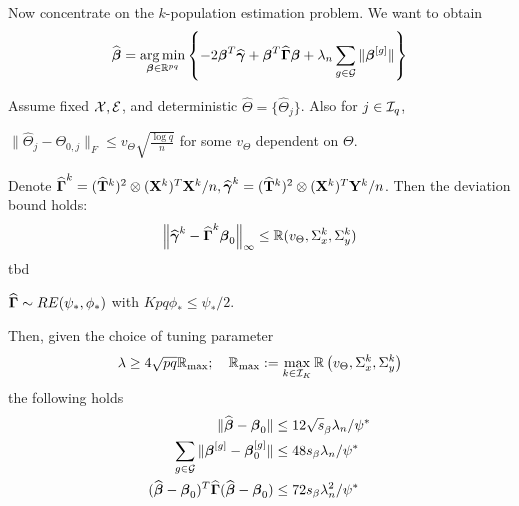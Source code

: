 \documentclass[12pt, letterpaper]{article}
\DeclareMathOperator*{\ve}{vec}
\DeclareMathOperator*{\argmin}{arg\,min}
\numberwithin{equation}{section}
\begin{document}
\hrulefill

Now concentrate on the $k$-population estimation problem. We want to obtain
%
$$
\widehat \bfbeta = \argmin_{\bfbeta \in \BR^{pq}} \left\{-2 \bfbeta^T \widehat \bfgamma + \bfbeta^T \widehat \bfGamma \bfbeta + \lambda_n \sum_{g \in \cG} \| \bfbeta^{[g]}  \| \right\}
$$
\begin{Theorem}\label{thm:BetaThm}
Assume fixed ${\cal{X}}, {\cal{E}}$, and deterministic $\widehat \Theta = \{ \widehat \Theta_j \}$. Also for $j \in {\cal{I}}_q$,

 $\| \widehat \Theta_j - \Theta_{0,j} \|_F \leq v_\Theta \sqrt{\frac{\log q}{n}}$ for some $v_\Theta$ dependent on $\Theta$.

 Denote $\widehat {{\boldsymbol{\Gamma}}}^k = (\widehat {{\mathbf{T}}}^k)^2 \otimes ({\mathbf{X}}^k)^T {\mathbf{X}}^k/n, \widehat {{\boldsymbol{\gamma}}}^k = (\widehat {{\mathbf{T}}}^k)^2 \otimes ({\mathbf{X}}^k)^T {\mathbf{Y}}^k/n$. Then the deviation bound holds:
%
$$
\left\| \widehat {{\boldsymbol{\gamma}}}^k - \widehat {{\boldsymbol{\Gamma}}}^k {\boldsymbol{\beta}}_0 \right\|_\infty \leq {\mathbb{R}}( v_\Theta, \Sigma_x^k, \Sigma_y^k)
$$
%
{\colrbf tbd}

 $\widehat {{\boldsymbol{\Gamma}}} \sim RE(\psi_*, \phi_*)$ with $Kpq \phi_* \leq \psi_*/2$.

Then, given the choice of tuning parameter
%
$$
\lambda \geq 4 \sqrt{pq} {\mathbb{R}}_{\max}; \quad {\mathbb{R}}_{\max} := \max_{k \in {\cal{I}}_K} {\mathbb{R}} \left(v_\Theta, \Sigma_x^k, \Sigma_y^k \right)
$$
%
the following holds
%
\begin{align}
\| \widehat {{\boldsymbol{\beta}}} - {\boldsymbol{\beta}}_0 \| & \leq 12 \sqrt s_\beta \lambda_n / \psi^* \label{eqn:BetaThmEqn1}\\
\sum_{g \in {\cal{G}}} \| {\boldsymbol{\beta}}^{[g]} - {\boldsymbol{\beta}}_0^{[g]} \| & \leq 48 s_\beta \lambda_n / \psi^* \label{eqn:BetaThmEqn2}\\
(\widehat {{\boldsymbol{\beta}}} - {\boldsymbol{\beta}}_0 )^T \widehat {{\boldsymbol{\Gamma}}} (\widehat {{\boldsymbol{\beta}}} - {\boldsymbol{\beta}}_0 ) & \leq
72 s_\beta \lambda_n^2 / \psi^* \label{eqn:BetaThmEqn3}
\end{align}
%
\end{Theorem}
\end{document}
